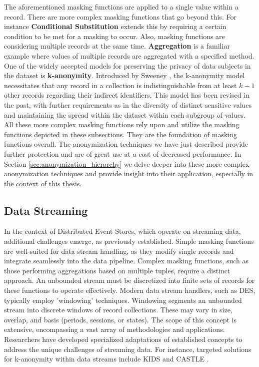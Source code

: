 The aforementioned masking functions are applied to a single value within a record. There are more complex masking functions that go beyond this. For instance \textbf{Conditional Substitution} extends this by requiring a certain condition to be met for a masking to occur. Also, masking functions are considering multiple records at the same time. \textbf{Aggregation} is a familiar example where values of multiple records are aggregated with a specified method. One of the widely accepted models for preserving the privacy of data subjects in the dataset is \textbf{k-anonymity}. Introduced by Sweeney \cite{sweeney2002kanonymity}, the k-anonymity model necessitates that any record in a collection is indistinguishable from at least $k-1$ other records regarding their indirect identifiers. This model has been revised in the past, with further requirements as in the diversity of distinct sensitive values and maintaining the spread within the dataset within each subgroup of values. All these more complex masking functions rely upon and utilize the masking functions depicted in these subsections. They are the foundation of masking functions overall. The anonymization techniques we have just described provide further protection and are of great use at a cost of decreased performance. In Section \ref{sec:anonymization_hierarchy} we delve deeper into these more complex anonymization techniques and provide insight into their application, especially in the context of this thesis. 

\subsection{Data Streaming\label{lit:data_streaming}}
In the context of Distributed Event Stores, which operate on streaming data, additional challenges emerge, as previously established. Simple masking functions are well-suited for data stream handling, as they modify single records and integrate seamlessly into the data pipeline. Complex masking functions, such as those performing aggregations based on multiple tuples, require a distinct approach. An unbounded stream must be discretized into finite sets of records for these functions to operate effectively. Modern data stream handlers, such as \ac{DES}, typically employ 'windowing' techniques. Windowing segments an unbounded stream into discrete windows of record collections. These may vary in size, overlap, and basis (periods, sessions, or states). The scope of this concept is extensive, encompassing a vast array of methodologies and applications. Researchers have developed specialized adaptations of established concepts to address the unique challenges of streaming data. For instance, targeted solutions for k-anonymity within data streams include KIDS \cite{KIDS_zhang} and CASTLE \cite{Cao2008}. 

